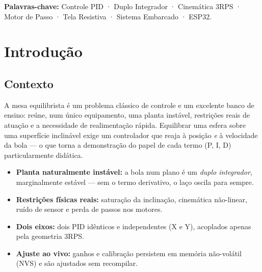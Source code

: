 \documentclass[11pt,a4paper,oneside]{article}
\begin{document}
\medskip
\noindent\textbf{Palavras-chave:} Controle PID · Duplo Integrador · Cinemática
3RPS · Motor de Passo · Tela Resistiva · Sistema Embarcado · ESP32.

\newpage
{\hypersetup{linkcolor=inkdark}
\renewcommand{\contentsname}{\color{primary}Sumário}
\tableofcontents}

\newpage

\section{Introdução}

\subsection{Contexto}

A mesa equilibrista é um problema clássico de controle e um excelente banco de
ensino: reúne, num único equipamento, uma planta instável, restrições reais de
atuação e a necessidade de realimentação rápida. Equilibrar uma esfera sobre uma
superfície inclinável exige um controlador que reaja à posição \emph{e} à
velocidade da bola — o que torna a demonstração do papel de cada termo (P, I, D)
particularmente didática.

\begin{infobox}
\begin{itemize}
  \item \textbf{Planta naturalmente instável:} a bola num plano é um
  \emph{duplo integrador}, marginalmente estável — sem o termo derivativo, o
  laço oscila para sempre.
  \item \textbf{Restrições físicas reais:} saturação da inclinação, cinemática
  não-linear, ruído de sensor e perda de passos nos motores.
  \item \textbf{Dois eixos:} dois PID idênticos e independentes (X e Y),
  acoplados apenas pela geometria 3RPS.
  \item \textbf{Ajuste ao vivo:} ganhos e calibração persistem em memória
  não-volátil (NVS) e são ajustados sem recompilar.
\end{itemize}
\end{infobox}
\end{document}
